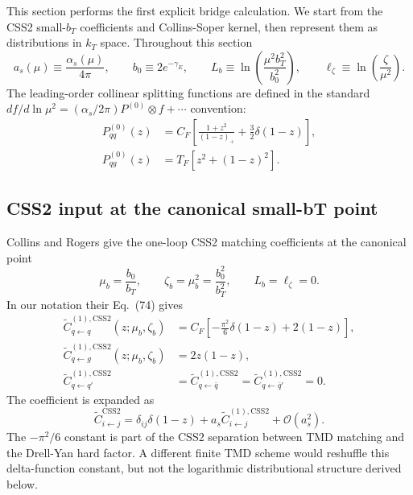 \documentclass[11pt]{article}
\newcommand{\order}[1]{\mathcal{O}\!\left(#1\right)}
\newcommand{\CSS}{\mathrm{CSS2}}
\begin{document}
This section performs the first explicit bridge calculation. We start from the CSS2
small-$b_T$ coefficients and Collins-Soper kernel, then represent them as distributions in
$k_T$ space. Throughout this section
\begin{equation}
  a_s(\mu)\equiv \frac{\alpha_s(\mu)}{4\pi},
  \qquad
  b_0\equiv 2e^{-\gamma_E},
  \qquad
  L_b\equiv \ln\!\left(\frac{\mu^2 b_T^2}{b_0^2}\right),
  \qquad
  \ell_\zeta\equiv \ln\!\left(\frac{\zeta}{\mu^2}\right).
  \label{eq:one-loop-defs}
\end{equation}
The leading-order collinear splitting functions are defined in the standard
$d f/d\ln\mu^2=(\alpha_s/2\pi)P^{(0)}\otimes f+\cdots$ convention:
\begin{align}
  P_{qq}^{(0)}(z)
  &= C_F\left[\frac{1+z^2}{(1-z)_+}+\frac{3}{2}\delta(1-z)\right],
  \\
  P_{qg}^{(0)}(z)
  &= T_F\left[z^2+(1-z)^2\right].
  \label{eq:LO-splittings}
\end{align}

\subsection{CSS2 input at the canonical small-bT point}

Collins and Rogers give the one-loop CSS2 matching coefficients at the canonical point~\cite{CollinsRogers2017}
\begin{equation}
  \mu_b=\frac{b_0}{b_T},
  \qquad
  \zeta_b=\mu_b^2=\frac{b_0^2}{b_T^2},
  \qquad
  L_b=\ell_\zeta=0.
\end{equation}
In our notation their Eq.~(74) gives
\begin{align}
  \widetilde C_{q\leftarrow q}^{(1),\CSS}(z;\mu_b,\zeta_b)
  &=
  C_F\left[-\frac{\pi^2}{6}\delta(1-z)+2(1-z)\right],
  \label{eq:Cqq-can}\\
  \widetilde C_{q\leftarrow g}^{(1),\CSS}(z;\mu_b,\zeta_b)
  &=2z(1-z),
  \label{eq:Cqg-can}\\
  \widetilde C_{q\leftarrow q'}^{(1),\CSS}
  &=\widetilde C_{q\leftarrow \bar q}^{(1),\CSS}
  =\widetilde C_{q\leftarrow \bar q'}^{(1),\CSS}=0.
  \label{eq:C-other-can}
\end{align}
The coefficient is expanded as
\begin{equation}
  \widetilde C_{i\leftarrow j}^{\CSS}
  =\delta_{ij}\delta(1-z)+a_s\widetilde C_{i\leftarrow j}^{(1),\CSS}
  +\order{a_s^2}.
  \label{eq:C-expansion-as}
\end{equation}
The $-\pi^2/6$ constant is part of the CSS2 separation between TMD matching and the
Drell-Yan hard factor. A different finite TMD scheme would reshuffle this delta-function
constant, but not the logarithmic distributional structure derived below.
\end{document}
